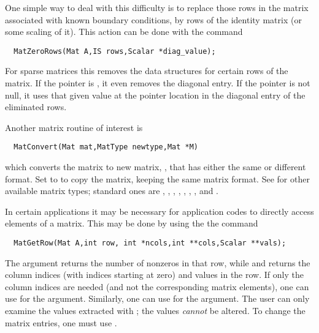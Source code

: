 One simple way to deal with this difficulty is to replace those rows in the 
matrix associated with known boundary conditions, by rows of the 
identity matrix (or some scaling of it). This action can be done with 
the command 
\begin{verbatim}
  MatZeroRows(Mat A,IS rows,Scalar *diag_value);
\end{verbatim}
For sparse matrices this removes the data structures for certain rows 
of the matrix. If the pointer  is , it 
even removes the diagonal entry. If the pointer is not null, it uses that 
given value at the pointer location 
in the diagonal entry of the eliminated rows. 


Another matrix routine of interest is 
\begin{verbatim}
  MatConvert(Mat mat,MatType newtype,Mat *M)
\end{verbatim}
which converts the matrix  to new matrix, , that has
either the same or different format.  Set  to 
to copy the matrix, keeping the same matrix format.  See 
 for other available matrix types;
standard ones are , ,   ,  
               , , ,  , and
               .

In certain applications it may be necessary for application codes
to directly access elements of a matrix. This may be done by using the 
the command 
\begin{verbatim}
  MatGetRow(Mat A,int row, int *ncols,int **cols,Scalar **vals);
\end{verbatim}
The argument  returns the number of nonzeros in that row, 
while  and  returns the column indices (with indices
starting at zero) and values in the row. If only the column 
indices are needed (and not the corresponding matrix elements), one
can use  for the  argument. Similarly,
one can use  for the  argument.
The user can only examine the values extracted with ;
the values {\em cannot} be altered. 
 
To change the matrix entries, one must use .


